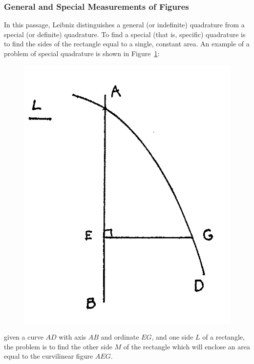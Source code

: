 \documentclass[twoside,openright]{article}
\begin{document}
\subsubsection*{General and Special Measurements of Figures}



In this passage, Leibniz distinguishes a general (or indefinite)
quadrature from a special (or definite) quadrature.  To find a special
(that is, specific) quadrature is to find the sides of the rectangle
equal to a single, constant area.  An example of a problem of special
quadrature is shown in Figure~\ref{fig25a}:
\begin{figure}[htp]
\begin{center}
\includegraphics[width=.5\textwidth]{fig/Figure29A}
\caption{}
\label{fig25a}
\end{center}
\end{figure} 
given a curve $AD$ with axis $AB$ and ordinate $EG$, and one side $L$
of a rectangle, the problem is to find the other side $M$ of the
rectangle which will enclose an area equal to the curvilinear figure
$AEG$.
	
\end{document}
